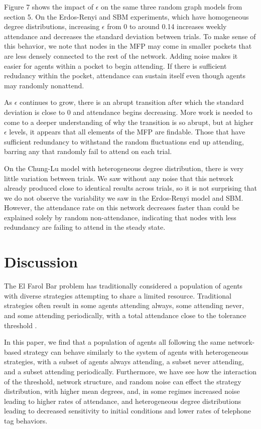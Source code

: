 \documentclass[12pt]{article}
\begin{document}
Figure 7 shows the impact of $\epsilon$ on the same three random graph models from section 5.  On the Erdos-Renyi and SBM experiments, which have homogeneous degree distributions, increasing $\epsilon$ from 0 to around 0.14 increases weekly attendance and decreases the standard deviation between trials.  To make sense of this behavior, we note that nodes in the MFP may come in smaller pockets that are less densely connected to the rest of the network.  Adding noise makes it easier for agents within a pocket to begin attending.  If there is sufficient redudancy within the pocket, attendance can sustain itself even though agents may randomly nonattend.  

As $\epsilon$ continues to grow, there is an abrupt transition after which the standard deviation is close to 0 and attendance begins decreasing.  More work is needed to come to a deeper understanding of why the transition is so abrupt, but at higher $\epsilon$ levels, it appears that all elements of the MFP are findable.  Those that have sufficient redundancy to withstand the random fluctuations end up attending, barring any that randomly fail to attend on each trial.

On the Chung-Lu model with heterogeneous degree distribution, there is very little variation between trials.  We saw without any noise that this network already produced close to identical results across trials, so it is not surprising that we do not observe the variability we saw in the Erdos-Renyi model and SBM.  However, the attendance rate on this network decreases faster than could be explained solely by random non-attendance, indicating that nodes with less redundancy are failing to attend in the steady state. 

\section{Discussion}

The El Farol Bar problem has traditionally considered a population of agents with diverse strategies attempting to share a limited resource.  Traditional strategies often result in some agents attending always, some attending never, and some attending periodically, with a total attendance close to the tolerance threshold\cite{arthur:1994} \cite{stLuce:2020}.

In this paper, we find that a population of agents all following the same network-based strategy can behave similarly to the system of agents with heterogeneous strategies, with a subset of agents always attending, a subset never attending, and a subset attending periodically.  Furthermore, we have see how the interaction of the threshold, network structure, and random noise can effect the strategy distribution, with higher mean degrees, and, in some regimes increased noise leading to higher rates of attendance, and heterogeneous degree distributions leading to decreased sensitivity to initial conditions and lower rates of telephone tag behaviors.
\end{document}
